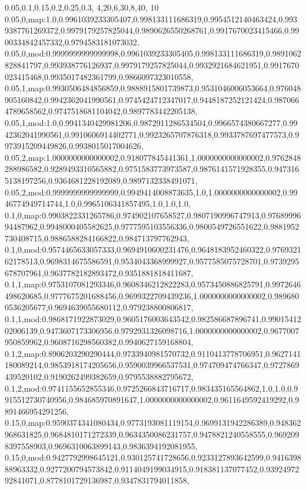 0.05,0.1,0.15,0.2,0.25,0.3,
4,20,6,30,8,40,
10
0.05,0,map:1.0,0.9961039233305407,0.998133111686319,0.9954512140463424,0.9939387761269372,0.9979179257825044,0.9890626550268761,0.9917670023415466,0.9900334842457332,0.9794583181073032,
0.05,0,mod:0.9999999999999998,0.9961039233305405,0.998133111686319,0.9891062828841797,0.993938776126937,0.9979179257825044,0.9932921684621951,0.9917670023415468,0.9935017482361799,0.9866097323010558,
0.05,1,map:0.9930506484856859,0.9888915801739873,0.9531046006053664,0.976048905160842,0.9942362041990561,0.9745424712347017,0.9448187252121424,0.9870664789658562,0.9747518681104042,0.9897783442205138,
0.05,1,mod:1.0,0.9941340429981206,0.9872911286534504,0.9966574380667277,0.9942362041990561,0.9910606914402771,0.9923265707876318,0.9933787697477573,0.9973915209449826,0.9938015017004626,
0.05,2,map:1.0000000000000002,0.918077845441361,1.0000000000000002,0.9762848288986582,0.9289493310565882,0.9751583773973587,0.9876141571928355,0.9473165138197256,0.9364681228192089,0.9897132338491071,
0.05,2,mod:0.9999999999999999,0.9949414008873635,1.0,1.0000000000000002,0.9946774949714744,1.0,0.9965106341857495,1.0,1.0,1.0,
0.1,0,map:0.9903822331265786,0.974902107658527,0.9807190996747913,0.9768999694487962,0.9948000405582625,0.9777595103556336,0.9800549726551622,0.9881952730408715,0.9886588284166822,0.984713797762943,
0.1,0,mod:0.9574465633057333,0.9694910600231476,0.9648183952460322,0.976932162178513,0.9698314675586591,0.9534043368999927,0.9577585075728701,0.9739295678707961,0.9637782182893472,0.9351881818411687,
0.1,1,map:0.9753107081293346,0.9608346212822283,0.9573450886825791,0.9972646498620685,0.9777675201688456,0.9699322709439236,1.0000000000000002,0.9896800536205677,0.9694639055680112,0.979238800806817,
0.1,1,mod:0.9868171922873029,0.9605176003643542,0.982586687896741,0.9901541202006139,0.9473607173306956,0.9792931326098716,1.0000000000000002,0.9677007950859962,0.9608716298560382,0.9940627159168804,
0.1,2,map:0.8906203290290444,0.9733940981570732,0.9110413778706951,0.9627141180089214,0.9853918174205656,0.9590039966537531,0.974709474766347,0.9727869439520102,0.9190262499382659,0.9795538882795672,
0.1,2,mod:0.9741155652855346,0.9725266843716717,0.983435165564862,1.0,1.0,0.9915512730740956,0.984685970891647,1.0000000000000002,0.9611649592419292,0.9891466954291256,
0.15,0,map:0.9590374341080434,0.9773193081119154,0.9699131942286389,0.948362968631825,0.9684810171272339,0.9634350086231757,0.9478821240558555,0.9692098397558903,0.9696310063899143,0.9836394192081955,
0.15,0,mod:0.9427792998645121,0.930125741728656,0.9233127893642599,0.941639888963332,0.9277200794573842,0.9114049199034915,0.918381137077452,0.9392497292841071,0.8778101729136987,0.9347831794011858,
